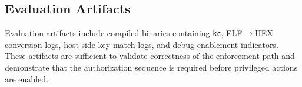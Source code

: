 \subsection{Evaluation Artifacts}
Evaluation artifacts include compiled binaries containing \texttt{kc}, ELF$\rightarrow$HEX
conversion logs, host-side key match logs, and debug enablement indicators. These artifacts
are sufficient to validate correctness of the enforcement path and demonstrate that the
authorization sequence is required before privileged actions are enabled.
